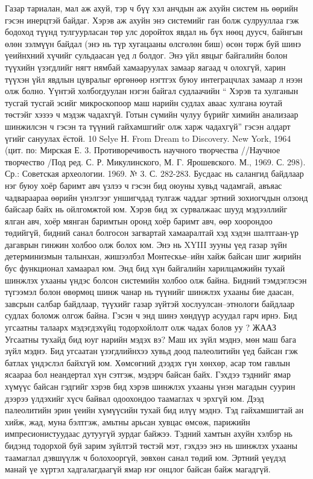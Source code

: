 Газар тариалан, мал аж ахуй, тэр ч бүү хэл анчдын аж ахуйн систем нь өөрийн гэсэн инерцтэй байдаг. Хэрэв аж ахуйн энэ системийг ган болж сулрууллаа гэж бодоход түүнд тулгуурласан төр улс доройтох явдал нь бүх нөөц дуусч, байнгын өлөн зэлмүүн байдал (энэ нь түр хугацааны өлсгөлөн биш) өсөн төрж буй шинэ үеийнхний хүчийг сульдаасан үед л болдог. Энэ үйл явцыг байгалийн болон түүхийн үзэгдлийг нягт нямбай хамааруулах замаар яагаад ч олохгүй, харин түүхэн үйл явдлын цувралыг өргөнөөр нэгтгэх буюу интеграцчлах замаар л нээн олж болно. Үүнтэй холбогдуулан нэгэн байгал судлаачийн “ Хэрэв та хулганын тусгай тусгай эсийг микроскопоор маш нарийн судлах аваас хулгана юутай төстэйг хэзээ ч мэдэж чадахгүй. Готын сүмийн чулуу бүрийг химийн анализаар шинжилсэн ч гэсэн та түүний гайхамшгийг олж харж чадахгүй” гэсэн алдарт үгийг сануулах ёстой.
10 Selye Н. From Dream to Discovery. New York, 1964 (цит. по: Мирская Е. 3. Противоречивость научного творчества //Научное творчество /Под ред. С. Р. Микулинского, М. Г. Ярошевского. М., 1969. С. 298). Ср.: Советская археологии. 1969. № 3. С. 282-283.
Бусдаас нь салангид байдлаар нэг буюу хоёр баримт авч үзлээ ч гэсэн бид оюуны хувьд чадамгай, авъяас чадвараараа өөрийн үнэлгээг уншигчдад тулгаж чаддаг эртний зохиогчдын олзонд байсаар байх нь ойлгомжтой юм. Хэрэв бид эх сурвалжаас шууд мэдээллийг ялган авч, хоёр мянган баримтын оронд хоёр баримт авч, өөр хоорондоо төдийгүй, бидний санал болгосон загвартай хамааралтай хэд хэдэн шалтгаан-үр дагаврын гинжин холбоо олж болох юм. Энэ нь XYIII зууны үед газар зүйн детерминизмын талынхан, жишээлбэл Монтескье–ийн хайж байсан шиг жирийн бус функционал хамаарал юм. Энд бид хүн байгалийн харилцамжийн тухай шинжлэх ухааны үндэс болсон системийн холбоо олж байна.
Бидний тэмдэглэсэн түгээмэл болон өвөрмөц шинж чанар нь түүнийг шинжлэх ухааны бие даасан, завсрын салбар байдлаар, түүхийг газар зүйтэй хослуулсан–этнологи байдлаар судлах боломж олгож байна. Гэсэн ч энд шинэ хөндүүр асуудал гарч ирнэ. Бид угсаатны талаарх мэдэгдэхүйц тодорхойлолт олж чадах болов уу ?
ЖААЗ
Угсаатны тухайд бид юуг нарийн мэдэх вэ? Маш их зүйл мэднэ, мөн маш бага зүйл мэднэ. Бид угсаатан үзэгдлийнхээ хувьд доод палеолитийн үед байсан гэж батлах үндэслэл байхгүй юм. Хөмсөгний дээдэх гүн хөнхөр, асар том гавлын ясаараа бол неандертал хүн сэтгэж, мэдэрч байсан байх. Гэхдээ тэднийг ямар хүмүүс байсан гэдгийг хэрэв бид хэрэв шинжлэх ухааны үнэн магадын суурин дээрээ үлдэхийг хүсч байвал одоохондоо таамаглах ч эрхгүй юм.
Дээд палеолитийн эрин үеийн хүмүүсийн тухай бид илүү мэднэ. Тэд гайхамшигтай ан хийж, жад, муна бэлтгэж, амьтны арьсан хувцас өмсөж, парижийн импресионистуудаас дутуугүй зурдаг байжээ. Тэдний хамтын ахуйн хэлбэр нь бидэнд тодорхой буй зарим зүйлтэй төстэй мэт, гэхдээ энэ нь шинжлэх ухааны таамаглал дэвшүүлж ч болохооргүй, зөвхөн санал төдий юм. Эртний үеүдэд манай үе хүртэл хадгалагдаагүй ямар нэг онцлог байсан байж магадгүй.

